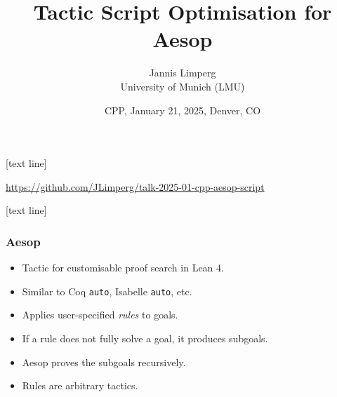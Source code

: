 \title{Tactic Script Optimisation for Aesop}
\author{Jannis Limperg\\ University of Munich (LMU)}
\date{CPP, January 21, 2025, Denver, CO}

[text line]{\parbox{\textwidth}{\centering \url{https://github.com/JLimperg/talk-2025-01-cpp-aesop-script}\medskip}}

\begin{frame}
  \maketitle
\end{frame}

[text line]{\parbox{\textwidth}{\centering \insertframenumber\medskip}}


\begin{frame}
  \frametitle{Aesop}

  \begin{itemize}[<+->]
    \item Tactic for customisable proof search in Lean 4.
    \item Similar to Coq \texttt{auto}, Isabelle \texttt{auto}, etc.
    \item Applies user-specified \emph{rules} to goals.
    \item If a rule does not fully solve a goal, it produces subgoals.
    \item Aesop proves the subgoals recursively.
    \item Rules are arbitrary tactics.
  \end{itemize}

  \pause

\end{frame}

\setlength{\columnsep}{0pt}

